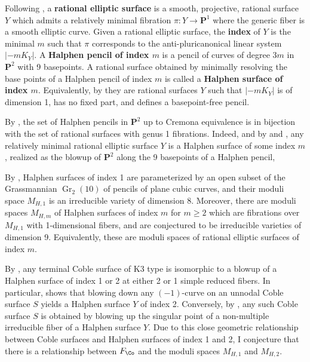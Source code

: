 \documentclass{amsart}
\begin{document}
Following \cite{mirandaModuliSpaceRational2021}, a \textbf{rational elliptic surface} is a smooth, projective, rational surface \(Y\) which admits a relatively minimal fibration \(\pi: Y\to {\mathbf{P}}^1\) where the generic fiber is a smooth elliptic curve. Given a rational elliptic surface, the \textbf{index} of \(Y\) is the minimal \(m\) such that \(\pi\) corresponds to the anti-pluricanonical linear system \({\left\lvert {-mK_Y} \right\rvert}\). A \textbf{Halphen pencil of index \(m\)} is a pencil of curves of degree \(3m\) in \({\mathbf{P}}^2\) with 9 basepoints. A rational surface obtained by minimally resolving the base points of a Halphen pencil of index \(m\) is called a \textbf{Halphen surface of index \(m\)}. Equivalently, by \cite[Def.\,3.18]{grivauxInfinitesimalDeformationsRational2018} they are rational surfaces \(Y\) such that \({\left\lvert {-mK_Y} \right\rvert}\) is of dimension 1, has no fixed part, and defines a basepoint-free pencil.

By \cite[Rmk.\,4.9.4]{EnriquesOne}, the set of Halphen pencils in \({\mathbf{P}}^2\) up to Cremona equivalence is in bijection with the set of rational surfaces with genus 1 fibrations. Indeed, and by \cite[Rmk.\,2.4]{DZ99} and \cite[\S 3.3.3]{grivauxInfinitesimalDeformationsRational2018}, any relatively minimal rational elliptic surface \(Y\) is a Halphen surface of some index \(m\), realized as the blowup of \({\mathbf{P}}^2\) along the 9 basepoints of a Halphen pencil,

By \cite[Rmk.\,2.8]{CD12}, Halphen surfaces of index 1 are parameterized by an open subset of the Grassmannian \({\operatorname{Gr}}_2(10)\) of pencils of plane cubic curves, and their moduli space \(M_{H, 1}\) is an irreducible variety of dimension 8. Moreover, there are moduli spaces \(M_{H, m}\) of Halphen surfaces of index \(m\) for \(m\geq 2\) which are fibrations over \(M_{H, 1}\) with 1-dimensional fibers, and are conjectured to be irreducible varieties of dimension 9. Equivalently, these are moduli spaces of rational elliptic surfaces of index \(m\).

By \cite[Prop.\,9.1.4]{EnriquesTwo}, any terminal Coble surface of K3 type is isomorphic to a blowup of a Halphen surface of index 1 or 2 at either 2 or 1 simple reduced fibers. In particular, \cite{DZ99} shows that blowing down any \((-1)\)-curve on an unnodal Coble surface \(S\) yields a Halphen surface \(Y\) of index 2. Conversely, by \cite{DM19}, any such Coble surface \(S\) is obtained by blowing up the singular point of a non-multiple irreducible fiber of a Halphen surface \(Y\). Due to this close geometric relationship between Coble surfaces and Halphen surfaces of index 1 and 2, I conjecture that there is a relationship between \(F_{\Co}\) and the moduli spaces \(M_{H, 1}\) and \(M_{H, 2}\).
\end{document}
